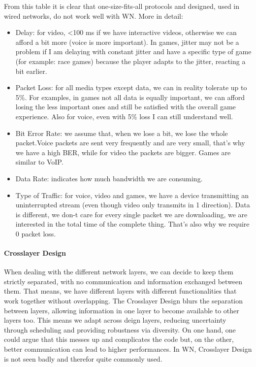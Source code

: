 From this table it is clear that one-size-fits-all protocols and 
designed, used in wired networks, do not work well with WN.
More in detail:

\begin{itemize}
\item Delay: for video, \textless100 ms if we have interactive 
  videos, otherwise we can afford a bit more (voice is more important).
  In games, jitter may not be a problem if I am delaying with 
  constant jitter and have a specific type of game (for example: race games) 
  because the player adapts to the jitter, reacting a bit earlier.
\item Packet Loss: for all media types except data, we can in 
  reality tolerate up to 5\%. For examples, in games not all data is equally 
  important, we can afford losing the less important ones and still be satisfied 
  with the overall game experience. Also for voice, even with 5\% loss I can
  still understand well.
\item Bit Error Rate: we assume that, when we lose a bit, we 
  lose the whole packet.Voice packets are sent very frequently and are very
  small, that's why we have a high BER, while for video the packets are bigger.
  Games are similar to VoIP.
\item Data Rate: indicates how much bandwidth we are consuming.
\item Type of Traffic: for voice, video and games, we have a 
  device transmitting an uninterrupted stream (even though video only transmits
  in 1 direction). Data is different, we don-t care for every single packet we
  are downloading, we are interested in the total time of the complete thing.
  That's also why we require 0 packet loss. 
\end{itemize}

\paragraph*{Crosslayer Design} When dealing with the different network 
layers, we can decide to keep them strictly separated, with no communication and 
information exchanged between them. That means, we have different layers with 
different functionalities that work together without overlapping. The Crosslayer 
Design blurs the separation between layers, allowing information in one layer to 
become available to other layers too. This means we adapt across deign layers, 
reducing uncertainty through scheduling and providing robustness via diversity.
On one hand, one could argue that this messes up and complicates the 
code but, on the other, better communication can lead to higher performances. In 
WN, Crosslayer Design is not seen badly and therefor quite commonly used.

